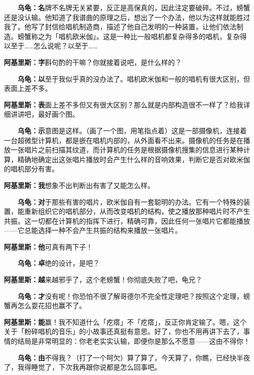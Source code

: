 \documentclass[
  12pt,
  twoside,
  openright,
  oldfontcommands,
]{memoir}
\newcommand{\kaitismall}[1]{{\kaitifamily\small #1}}
\newcommand{\heititext}[1]{{\heifamily\bfseries #1}}
\newcommand{\dialogname}[1]{{\heifamily\bfseries #1}}
\begin{document}
\dialogname{　　乌龟：}\heititext{名}牌不名牌无关紧要，反正是高保真的，因此注定要破碎。不过，螃蟹还是没认输。他知道了我谱曲的原理之后，想出了一个办法，他以为这样就能胜过我了。他写了封信给唱机制造商，描述了他自己发明的一种装置，让他们依法制造。螃蟹称之为「唱机欧米伽」。这是一种比一般唱机都复杂得多的唱机，复杂得以至于\ldots\ldots 怎么说呢？以至于\ldots\ldots{}

\dialogname{阿基里斯：}\heititext{字}斟句酌的干嘛？你就接着说吧，是什么样的？

\dialogname{　　乌龟：}\heititext{以}至于我似乎真的没办法了。唱机欧米伽和一般的唱机有很大区别，但表面上差不多。

\dialogname{阿基里斯：}\heititext{表}面上差不多但又有很大区别？那么就是内部构造很不一样了？给我详细讲讲吧，最好画个图。

\dialogname{　　乌龟：}\heititext{示}意图是这样。\kaitismall{（画了一个图，用笔指点着）}这是一部摄像机，连接着一台超微型计算机，都是嵌在唱机内部的，从外面看不出来。摄像机的任务是在播放一张唱片之前扫描其纹道，而计算机的任务是根据摄像机搜集的信息进行某种计算，精确地确定出这张唱片播放时会产生什么样的音响效果，判断它是否对欧米伽的唱机部分有害。

\dialogname{阿基里斯：}\heititext{我}想象不出判断出有害了又能怎么样。

\dialogname{　　乌龟：}\heititext{对}于那些有害的唱片，欧米伽自有一套聪明的办法。它有一个特殊的装置，能重新组织它的唱机部分，从而改变唱机的结构，使之播放那种唱片时不产生共振。这一切都在计算机的指挥下进行，精确可靠，因此任何一张唱片它都能播放------它总能选择一种不会产生共振的结构来播放一张唱片。

\dialogname{阿基里斯：}\heititext{他}可真有两下子！

\dialogname{　　乌龟：}\heititext{卓}绝的设计，是吧？

\dialogname{阿基里斯：}\heititext{越}来越邪乎了，这个老螃蟹！你彻底失败了吧，龟兄？

\dialogname{　　乌龟：}\heititext{才}没有呢！你恐怕不很了解哥德尔不完全性定理吧？按照这个定理，螃蟹再怎么耍花招也赢不了。

\dialogname{阿基里斯：}\heititext{能}赢！我不知道什么「疙瘩」不「疙瘩」，反正你肯定输了。嗯，这个关于「粉碎唱机的音乐」的小故事还真挺有意思。好了，你也不用再讲下去了，事情的结局是非常明显的：你老老实实认输，即便你是那么不愿意------这由不得你！

\dialogname{　　乌龟：}\heititext{由}不得我？\kaitismall{（打了一个呵欠）}算了算了，今天算了，你瞧，已经快半夜了，我得睡觉了，下次我再跟你说都是怎么回事吧。
\end{document}
